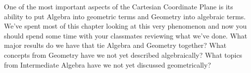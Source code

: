 {One of the most important aspects of the Cartesian Coordinate Plane is its ability to put Algebra into geometric terms and Geometry into algebraic terms.  We've spent most of this chapter looking at this very phenomenon and now you should spend some time with your classmates reviewing what we've done.  What major results do we have that tie Algebra and Geometry together?  What concepts from Geometry have we not yet described algebraically?  What topics from Intermediate Algebra have we not yet discussed geometrically? }
{}